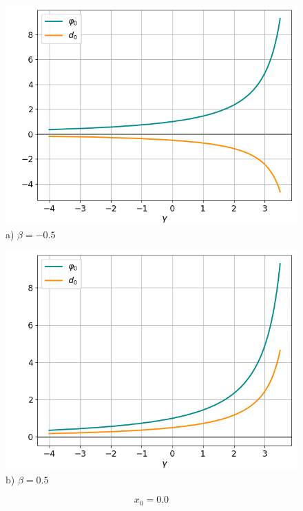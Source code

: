 \documentclass[fullscreen=true, unicode, bookmarks=false]{beamer}
\begin{document}
\begin{frame}
\begin{figure} 
\begin{minipage}[h]{0.49\linewidth}
\begin{center}
\includegraphics[scale=0.38]{divergent_phi0d0_x0=0,0,beta=-0,5.png} \\ {\scriptsize a) $ \beta = -0.5 $}
\end{center}
\end{minipage} 
\hfill
\begin{minipage}[h]{0.49\linewidth}
\begin{center}
\includegraphics[scale=0.38]{divergent_phi0d0_x0=0,0,beta=0,5.png}  \\ {\scriptsize b) $ \beta = 0.5 $}
\end{center}
\end{minipage} 
\end{figure}

$$ x_0 = 0.0 $$

\end{frame}
\end{document}
